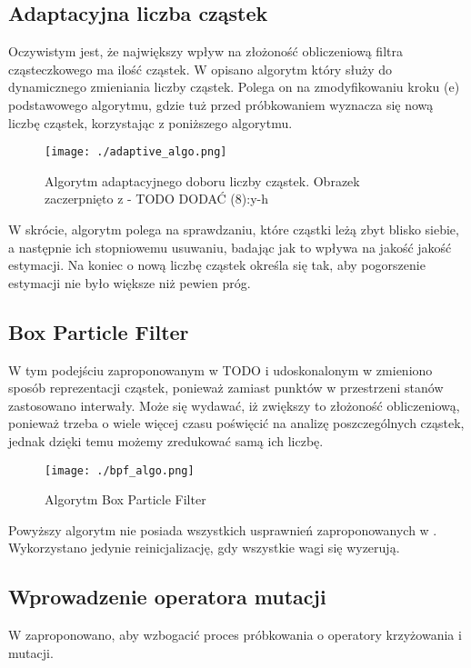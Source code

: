 \documentclass[10pt,a4paper]{article}
\begin{document}
\subsection{Adaptacyjna liczba cząstek}
Oczywistym jest, że największy wpływ na złożoność obliczeniową filtra cząsteczkowego ma ilość cząstek. W \cite{adaptive} opisano algorytm który służy do dynamicznego zmieniania liczby cząstek. Polega on na zmodyfikowaniu kroku (e) podstawowego algorytmu, gdzie tuż przed próbkowaniem wyznacza się nową liczbę cząstek, korzystając z poniższego algorytmu.

\begin{figure}[H]
	\begin{center}
		\texttt{[image: ./adaptive\_algo.png]}
		\caption{Algorytm adaptacyjnego doboru liczby cząstek. Obrazek zaczerpnięto z\cite{adaptive} - TODO DODAĆ (8):y-h}
	\end{center}
\end{figure}

W skrócie, algorytm polega na sprawdzaniu, które cząstki leżą zbyt blisko siebie, a następnie ich stopniowemu usuwaniu, badając jak to wpływa na jakość jakość estymacji. Na koniec o nową liczbę cząstek określa się tak, aby pogorszenie estymacji nie było większe niż pewien próg.

\subsection{Box Particle Filter}
W tym podejściu zaproponowanym w \cite{bpfln}TODO i udoskonalonym w \cite{brbpf} zmieniono sposób reprezentacji cząstek, ponieważ zamiast punktów w przestrzeni stanów zastosowano interwały. Może się wydawać, iż zwiększy to złożoność obliczeniową, ponieważ trzeba o wiele więcej czasu poświęcić na analizę poszczególnych cząstek, jednak dzięki temu możemy zredukować samą ich liczbę.

\begin{figure}[H]
	\begin{center}
		\texttt{[image: ./bpf\_algo.png]}
		\caption{Algorytm Box Particle Filter}
	\end{center}
\end{figure}

Powyższy algorytm nie posiada wszystkich usprawnień zaproponowanych w \cite{brbpf}. Wykorzystano jedynie reinicjalizację, gdy wszystkie wagi się wyzerują.

\subsection{Wprowadzenie operatora mutacji}
W \cite{pfgen} zaproponowano, aby wzbogacić proces próbkowania o operatory krzyżowania i mutacji.
\end{document}
